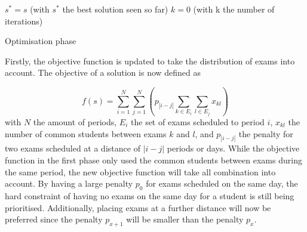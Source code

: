\begin{algorithm}
 $s^* = s$ (with $s^*$ the best solution seen so far)\;
 $k = 0$ (with k the number of iterations)\;

\caption{Optimisation phase}
\label{alg:phase2}
\end{algorithm}


Firstly, the objective function is updated to take the distribution of exams into account. The objective of a solution is now defined as

\begin{equation}
    f(s) = \sum_{i=1}^{N} \sum_{j=1}^{N}(p_{|i-j|} \sum_{k \in E_i}^{}\sum_{l \in E_j}^{} x_{kl})
\end{equation}
with $N$ the amount of periods, $E_i$ the set of exams scheduled to period $i$, $x_{kl}$ the number of common students between exams $k$ and $l$, and $p_{|i-j|}$ the penalty for two exams scheduled at a distance of $|i-j|$ periods or days. While the objective function in the first phase only used the common students between exams during the same period, the new objective function will take all combination into account. By having a large penalty $p_0$ for exams scheduled on the same day, the hard constraint of having no exams on the same day for a student is still being prioritised. Additionally, placing exams at a further distance will now be preferred since the penalty $p_{x+1}$ will be smaller than the penalty $p_x$.

